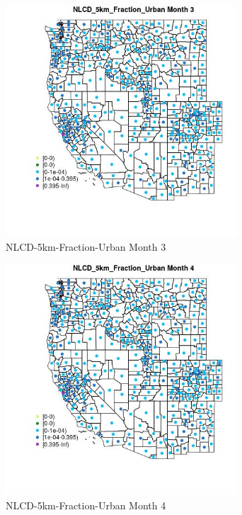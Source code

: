\begin{figure} 
\centering  
\includegraphics[width=0.77\textwidth]{Code_Outputs/df_report_ML_predictors_CountyCentroid_Locations_Dates_2008-01-01to2018-12-31_MapObsMo3NLCD_5km_Fraction_Urban.jpg} 
\caption{\label{fig:df_report_ML_predictors_CountyCentroid_Locations_Dates_2008-01-01to2018-12-31MapObsMo3NLCD_5km_Fraction_Urban}NLCD-5km-Fraction-Urban Month 3} 
\end{figure} 
 

\begin{figure} 
\centering  
\includegraphics[width=0.77\textwidth]{Code_Outputs/df_report_ML_predictors_CountyCentroid_Locations_Dates_2008-01-01to2018-12-31_MapObsMo4NLCD_5km_Fraction_Urban.jpg} 
\caption{\label{fig:df_report_ML_predictors_CountyCentroid_Locations_Dates_2008-01-01to2018-12-31MapObsMo4NLCD_5km_Fraction_Urban}NLCD-5km-Fraction-Urban Month 4} 
\end{figure} 
 

